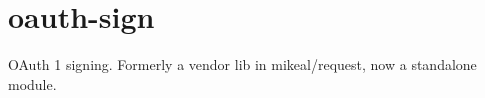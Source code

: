 \chapter{oauth-\/sign}
\hypertarget{md__c_1_2_users_2_s_t_r_i_d_e_r_2source_2repos_2_internal_a_p_i_2_internal_a_p_i_2wwwroot_2lib_24b623efa7155414727c9b3d00a6c1f00}{}\label{md__c_1_2_users_2_s_t_r_i_d_e_r_2source_2repos_2_internal_a_p_i_2_internal_a_p_i_2wwwroot_2lib_24b623efa7155414727c9b3d00a6c1f00}
OAuth 1 signing. Formerly a vendor lib in mikeal/request, now a standalone module. 